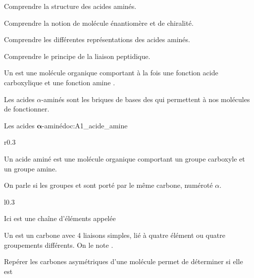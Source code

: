 \teteTermStssBiom


\begin{objectifs}
  \item Comprendre la structure des acides aminés.
  \item Comprendre la notion de molécule énantiomère et de chiralité.
  \item Comprendre les différentes représentations des acides aminés.
  \item Comprendre le principe de la liaison peptidique.
\end{objectifs}

\begin{contexte}
  Un  est une molécule organique comportant à la fois une fonction acide carboxylique  et une fonction amine .

  Les acides $\alpha$-aminés sont les briques de bases des  qui permettent à nos molécules de fonctionner. 
  
\end{contexte}


\begin{doc}{Les acides $\mathbf{\alpha}$-aminé}{doc:A1_acide_amine}
  \begin{wrapfigure}[3]{r}{0.3\linewidth}
    \centering
    \vspace*{-24pt}
  \end{wrapfigure}
  Un acide aminé est une molécule organique comportant un groupe carboxyle et un groupe amine.

  \begin{importants}
    On parle  si les groupes  et  sont porté par le même carbone, numéroté $\alpha$.
  \end{importants}
  
  \begin{wrapfigure}{l}{0.3\linewidth}
    \centering
    \vspace*{-10pt}
  \end{wrapfigure}

  Ici  est une chaîne d'éléments appelée 
  
  \begin{importants}  
    Un  est un carbone avec 4 liaisons simples, lié à quatre élément ou quatre groupements différents.
    On le note .
  \end{importants}

  Repérer les carbones asymétriques d'une molécule permet de déterminer si elle est 
\end{doc}


